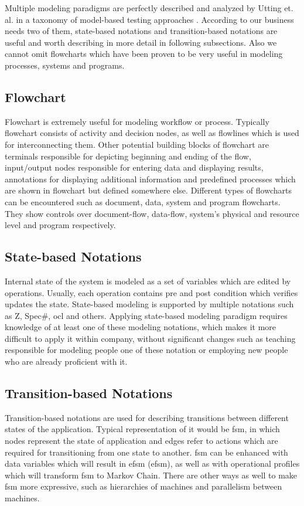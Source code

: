 Multiple modeling paradigms are perfectly described and analyzed by Utting et. al. in a taxonomy of model-based testing approaches \cite{Pretschner_Taxonomy}. According to our business needs two of them, state-based notations and transition-based notations are useful and worth describing in more detail in following subsections. Also we cannot omit flowcharts which have been proven to be very useful in modeling processes, systems and programs. 

\subsection{Flowchart}
\par
Flowchart \cite{Flowchart} is extremely useful for modeling workflow or process. Typically flowchart consists of activity and decision nodes, as well as flowlines which is used for interconnecting them. Other potential building blocks of flowchart are terminals responsible for depicting beginning and ending of the flow, input/output nodes responsible for entering data and displaying results, annotations for displaying additional information and predefined processes which are shown in flowchart but defined somewhere else. Different types of flowcharts can be encountered such as document, data, system and program flowcharts. They show controls over document-flow, data-flow, system's physical and resource level and program respectively.

\subsection{State-based Notations}
\par
Internal state of the system is modeled as a set of variables which are edited by operations. Usually, each operation contains pre and post condition which verifies updates the state\cite{Pretschner_Taxonomy}. State-based modeling is supported by multiple notations such as Z, Spec\#, \acrshort{ocl} and others. Applying state-based modeling paradigm requires knowledge of at least one of these modeling notations, which makes it more difficult to apply it within company, without significant changes such as teaching responsible for modeling people one of these notation or employing new people who are already proficient with it. 

\subsection{Transition-based Notations}
\par
Transition-based notations are used for describing transitions between different states of the application. Typical representation of it would be \acrshort{fsm}, in which nodes represent the state of application and edges refer to actions which are required for transitioning from one state to another. \acrshort{fsm} can be enhanced with data variables which will result in \acrlong{efsm} (\acrshort{efsm}), as well as with operational profiles which will transform \acrshort{fsm} to Markov Chain. There are other ways as well to make \acrshort{fsm} more expressive, such as hierarchies of machines and parallelism between machines\cite{Pretschner_Taxonomy}.

